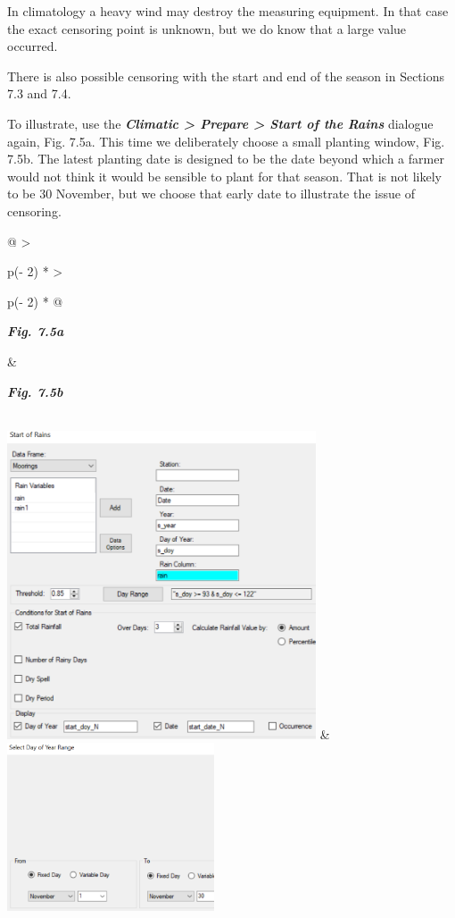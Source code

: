 \documentclass[
  letterpaper,
  DIV=11,
  numbers=noendperiod]{scrreprt}
\begin{document}
In climatology a heavy wind may destroy the measuring equipment. In that
case the exact censoring point is unknown, but we do know that a large
value occurred.

There is also possible censoring with the start and end of the season in
Sections 7.3 and 7.4.

To illustrate, use the \textbf{\emph{Climatic \textgreater{} Prepare
\textgreater{} Start of the Rains}} dialogue again, Fig. 7.5a. This time
we deliberately choose a small planting window, Fig. 7.5b. The latest
planting date is designed to be the date beyond which a farmer would not
think it would be sensible to plant for that season. That is not likely
to be 30 November, but we choose that early date to illustrate the issue
of censoring.

\begin{longtable}[]{@{}
  >{\raggedright\arraybackslash}p{(\columnwidth - 2\tabcolsep) * }
  >{\raggedright\arraybackslash}p{(\columnwidth - 2\tabcolsep) * }@{}}
\toprule\noalign{}
\begin{minipage}[b]{\linewidth}\raggedright
\textbf{\emph{Fig. 7.5a}}
\end{minipage} & \begin{minipage}[b]{\linewidth}\raggedright
\textbf{\emph{Fig. 7.5b}}
\end{minipage} \\
\midrule\noalign{}
\endhead
\bottomrule\noalign{}
\endlastfoot
\includegraphics[width=3.60635in,height=3.5928in]{figures/Fig7.5a.png} &
\includegraphics[width=2.41252in,height=1.95945in]{figures/Fig7.5b.png} \\
\end{longtable}
\end{document}
